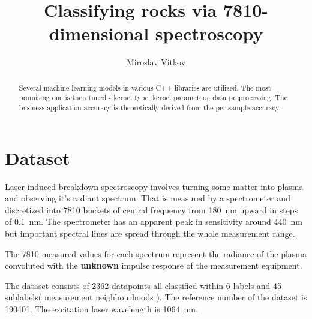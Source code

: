 \documentclass{article}
\title{Classifying rocks via 7810-dimensional spectroscopy}
\author{Miroslav Vitkov}
\begin{document}
\maketitle


\begin{abstract}
Several machine learning models in various C++ libraries are utilized.
The most promising one is then tuned - kernel type, kernel parameters, data preprocessing.
The business application accuracy is theoretically derived from the per sample accuracy.
\end{abstract}


\section{Dataset}
Laser-induced breakdown spectroscopy\cite{libs_intro} involves turning some matter into plasma and observing it's radiant spectrum.
That is measured by a spectrometer and discretized into 7810 buckets of central frequency from  \SI{180}{\nano\metre} upward in steps of \SI{0.1}{\nano\metre}.
The spectrometer has an apparent peak in sensitivity around \SI{440}{\nano\metre} but important spectral lines are spread through the whole measurement range.
\par
The 7810 measured values for each spectrum represent the radiance\cite{radiance} of the plasma convoluted with the \textbf{unknown} impulse response of the measurement equipment.
\par
The dataset consists of 2362 datapoints all classified within 6 labels and 45 sublabels( measurement neighbourhoods ).
The reference number of the dataset is 190401.
The excitation laser wavelength is \SI{1064}{\nano\metre}.
\end{document}
